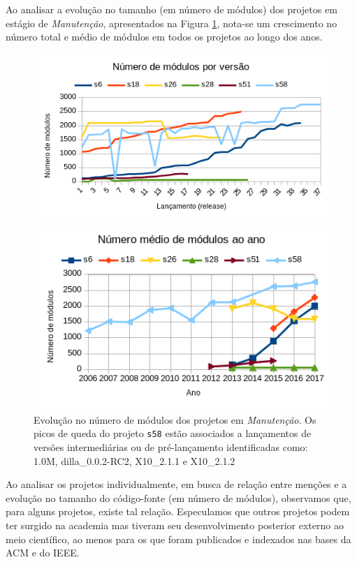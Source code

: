 Ao analisar a evolução no tamanho (em número de módulos) 
dos projetos em estágio de {\it Manutenção}, apresentados na Figura \ref{modules-evolution-servicing},
nota-se um crescimento no número total e médio de módulos
em todos os projetos ao longo dos anos.

\begin{figure}[ht]
  \center
  \includegraphics[scale=0.8]{imagens/modules-evolution-servicing.png}

  \includegraphics[scale=0.8]{imagens/modules-evolution-average.png}
  \caption{Evolução no número de módulos dos projetos em \textit{Manutenção}.
           Os picos de queda do projeto \texttt{s58} estão associados a lançamentos
           de versões intermediárias ou de pré-lançamento identificadas como:
           1.0M, dilla\_0.0.2-RC2, X10\_2.1.1 e X10\_2.1.2}
  \label{modules-evolution-servicing}
\end{figure}

Ao analisar os projetos individualmente, em busca de relação entre
menções e a evolução no tamanho do código-fonte (em número de módulos), 
observamos que, para alguns projetos, existe tal relação.
Especulamos que outros projetos podem ter surgido na academia mas 
tiveram seu desenvolvimento posterior externo ao meio científico, 
ao menos para os que foram publicados e indexados nas bases da ACM e do IEEE.

